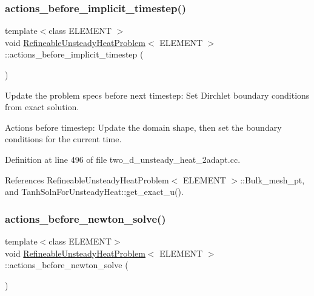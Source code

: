 \mbox{\label{classRefineableUnsteadyHeatProblem_ac754f1313cd6d684c149443beb5bcf9e}} 
\subsubsection{\texorpdfstring{actions\+\_\+before\+\_\+implicit\+\_\+timestep()}{actions\_before\_implicit\_timestep()}}
{\footnotesize\ttfamily template$<$class E\+L\+E\+M\+E\+NT $>$ \\
void \hyperlink{classRefineableUnsteadyHeatProblem}{Refineable\+Unsteady\+Heat\+Problem}$<$ E\+L\+E\+M\+E\+NT $>$\+::actions\+\_\+before\+\_\+implicit\+\_\+timestep (\begin{DoxyParamCaption}{ }\end{DoxyParamCaption})}



Update the problem specs before next timestep\+: Set Dirchlet boundary conditions from exact solution. 

Actions before timestep\+: Update the domain shape, then set the boundary conditions for the current time. 

Definition at line 496 of file two\+\_\+d\+\_\+unsteady\+\_\+heat\+\_\+2adapt.\+cc.



References Refineable\+Unsteady\+Heat\+Problem$<$ E\+L\+E\+M\+E\+N\+T $>$\+::\+Bulk\+\_\+mesh\+\_\+pt, and Tanh\+Soln\+For\+Unsteady\+Heat\+::get\+\_\+exact\+\_\+u().

\mbox{\label{classRefineableUnsteadyHeatProblem_aac1935e15c67b196e6db97dd058511b5}} 
\subsubsection{\texorpdfstring{actions\+\_\+before\+\_\+newton\+\_\+solve()}{actions\_before\_newton\_solve()}}
{\footnotesize\ttfamily template$<$class E\+L\+E\+M\+E\+NT$>$ \\
void \hyperlink{classRefineableUnsteadyHeatProblem}{Refineable\+Unsteady\+Heat\+Problem}$<$ E\+L\+E\+M\+E\+NT $>$\+::actions\+\_\+before\+\_\+newton\+\_\+solve (\begin{DoxyParamCaption}{ }\end{DoxyParamCaption})\hspace{0.3cm}{\ttfamily [inline]}}



